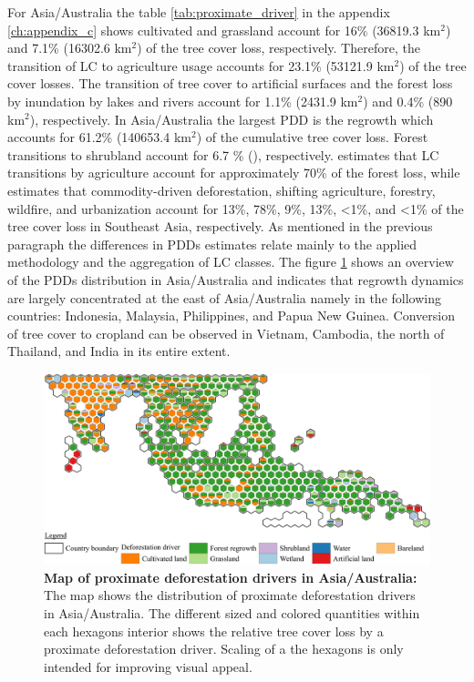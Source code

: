 			For Asia/Australia the table \ref{tab:proximate_driver} in the appendix \ref{ch:appendix_c} shows cultivated and grassland account for 16\% (36819.3 km$^2$) and 7.1\% (16302.6 km$^2$) of the tree cover loss, respectively. Therefore, the transition of \ac{LC} to agriculture usage accounts for 23.1\% (53121.9 km$^2$) of the tree cover losses. The transition of tree cover to artificial surfaces and the forest loss by inundation by lakes and rivers account for 1.1\% (2431.9 km$^2$) and 0.4\% (890 km$^2$), respectively. In Asia/Australia the largest \ac{PDD} is the regrowth which accounts for 61.2\% (140653.4 km$^2$) of the cumulative tree cover loss. Forest transitions to shrubland account for 6.7 \% (), respectively. \citeauthor{Hosonuma2012} estimates that \ac{LC} transitions by agriculture account for approximately 70\% of the forest loss, while \citeauthor{Curtis2018} estimates that commodity-driven deforestation, shifting agriculture, forestry, wildfire, and urbanization account for 13\%, 78\%, 9\%, 13\%, <1\%, and <1\% of the tree cover loss in Southeast Asia, respectively. As mentioned in the previous paragraph the differences in \acp{PDD} estimates relate mainly to the applied methodology and the aggregation of \ac{LC} classes. The figure \ref{fig:asia_driver} shows an overview of the \acp{PDD} distribution in Asia/Australia and indicates that regrowth dynamics are largely concentrated at the east of Asia/Australia namely in the following countries: Indonesia, Malaysia, Philippines, and Papua New Guinea. Conversion of tree cover to cropland can be observed in Vietnam, Cambodia, the north of Thailand, and India in its entire extent. 
			\begin{figure}[ht]
				\centering
				\includegraphics[scale=1]{img/asia_driver_frameless}
				\caption[Map of proximate deforestation drivers in Asia/Australia]{\textbf{Map of proximate deforestation drivers in Asia/Australia:} The map shows the distribution of proximate deforestation drivers in Asia/Australia. The different sized and colored quantities within each hexagons interior shows the relative tree cover loss by a proximate deforestation driver. Scaling of a the hexagons is only intended for improving visual appeal.}
				\label{fig:asia_driver}
			\end{figure}

